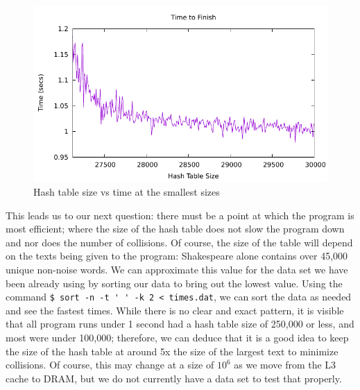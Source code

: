 \documentclass[12pt]{article}
\begin{document}
\begin{figure}[H]\begin{centering}
\includegraphics{plots/smallest-ht-time.pdf}\caption{Hash table size vs time at the smallest sizes}
\end{centering}\end{figure}

This leads us to our next question: there must be a point at which the program is most efficient; where the size of the hash table does not slow the program down and nor does the number of collisions. Of course, the size of the table will depend on the texts being given to the program: Shakespeare alone contains over 45,000 unique non-noise words. We can approximate this value for the data set we have been already using by sorting our data to bring out the lowest value. Using the command \verb|$ sort -n -t ' ' -k 2 < times.dat|, we can sort the data as needed and see the fastest times. While there is no clear and exact pattern, it is visible that all program runs under 1 second had a hash table size of 250,000 or less, and most were under 100,000; therefore, we can deduce that it is a good idea to keep the size of the hash table at around 5x the size of the largest text to minimize collisions. Of course, this may change at a size of $10^6$ as we move from the L3 cache to DRAM, but we do not currently have a data set to test that properly.
\end{document}
